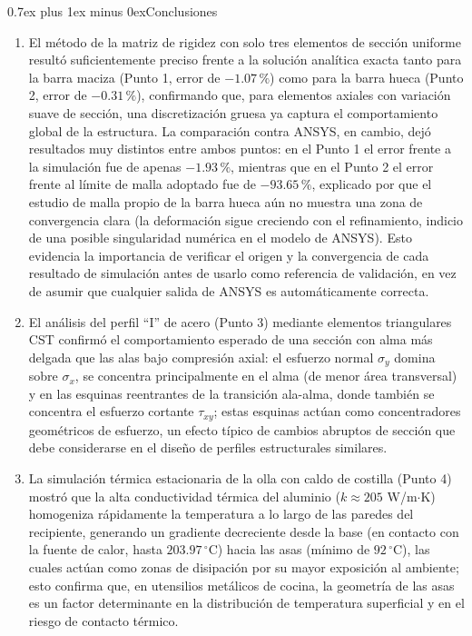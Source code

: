 \documentclass[conference]{IEEEtran}
\makeatletter
\def\section{\@startsection{section}{1}{\z@}{1.5ex plus 1.5ex minus 0.5ex}%
{0.7ex plus 1ex minus 0ex}{\normalfont\large\bfseries\centering\scshape}}%
\makeatother
\begin{document}
\section{Conclusiones}
\begin{enumerate}
    \item El método de la matriz de rigidez con solo tres elementos de sección uniforme resultó suficientemente preciso frente a la solución analítica exacta tanto para la barra maciza (Punto 1, error de $-1.07\,\%$) como para la barra hueca (Punto 2, error de $-0.31\,\%$), confirmando que, para elementos axiales con variación suave de sección, una discretización gruesa ya captura el comportamiento global de la estructura. La comparación contra ANSYS, en cambio, dejó resultados muy distintos entre ambos puntos: en el Punto 1 el error frente a la simulación fue de apenas $-1.93\,\%$, mientras que en el Punto 2 el error frente al límite de malla adoptado fue de $-93.65\,\%$, explicado por que el estudio de malla propio de la barra hueca aún no muestra una zona de convergencia clara (la deformación sigue creciendo con el refinamiento, indicio de una posible singularidad numérica en el modelo de ANSYS). Esto evidencia la importancia de verificar el origen y la convergencia de cada resultado de simulación antes de usarlo como referencia de validación, en vez de asumir que cualquier salida de ANSYS es automáticamente correcta.

    \item El análisis del perfil ``I'' de acero (Punto 3) mediante elementos triangulares CST confirmó el comportamiento esperado de una sección con alma más delgada que las alas bajo compresión axial: el esfuerzo normal $\sigma_y$ domina sobre $\sigma_x$, se concentra principalmente en el alma (de menor área transversal) y en las esquinas reentrantes de la transición ala-alma, donde también se concentra el esfuerzo cortante $\tau_{xy}$; estas esquinas actúan como concentradores geométricos de esfuerzo, un efecto típico de cambios abruptos de sección que debe considerarse en el diseño de perfiles estructurales similares.

    \item La simulación térmica estacionaria de la olla con caldo de costilla (Punto 4) mostró que la alta conductividad térmica del aluminio ($k\approx205$ W/m$\cdot$K) homogeniza rápidamente la temperatura a lo largo de las paredes del recipiente, generando un gradiente decreciente desde la base (en contacto con la fuente de calor, hasta $203.97\,^{\circ}$C) hacia las asas (mínimo de $92\,^{\circ}$C), las cuales actúan como zonas de disipación por su mayor exposición al ambiente; esto confirma que, en utensilios metálicos de cocina, la geometría de las asas es un factor determinante en la distribución de temperatura superficial y en el riesgo de contacto térmico.


\end{enumerate}
\end{document}
